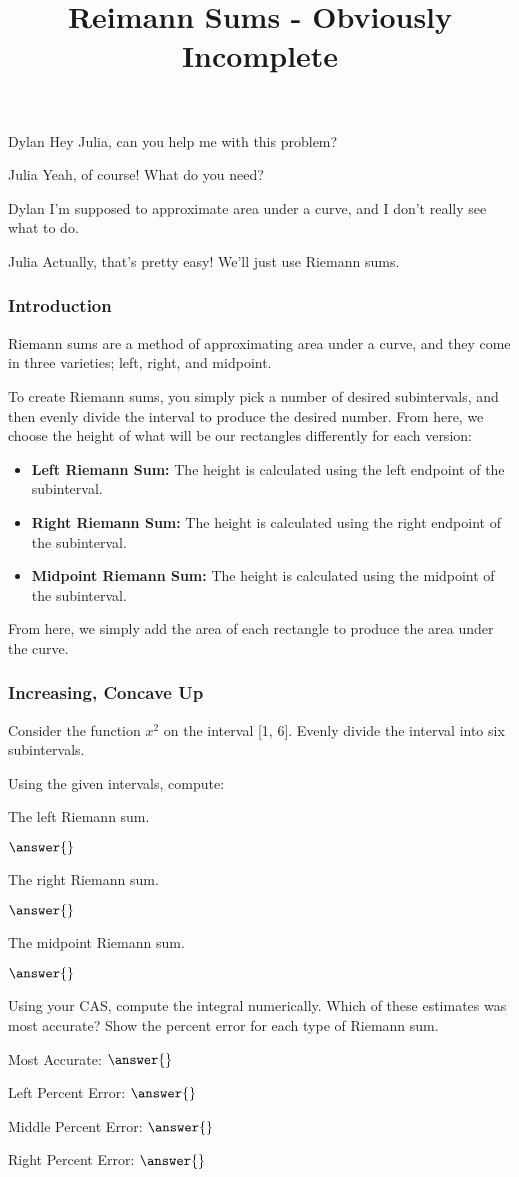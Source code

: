 \documentclass{ximera}
\title{Reimann Sums - Obviously Incomplete}
\begin{document}
\maketitle
\begin{dialogue}
\item[Dylan] Hey Julia, can you help me with this problem?
\item[Julia] Yeah, of course! What do you need?
\item[Dylan] I'm supposed to approximate area under a curve, and I don't really see what to do.
\item[Julia] Actually, that's pretty easy! We'll just use Riemann sums.
\end{dialogue}

\subsubsection{Introduction}
Riemann sums are a method of approximating area under a curve, and they come in three varieties; left, right, and midpoint.

To create Riemann sums, you simply pick a number of desired subintervals, and then evenly divide the interval to produce the desired number. From here, we choose the height of what will be our rectangles differently for each version:
\begin{itemize}
\item{\textbf{Left Riemann Sum:} The height is calculated using the left endpoint of the subinterval.}
\item{\textbf{Right Riemann Sum:} The height is calculated using the right endpoint of the subinterval.}
\item{\textbf{Midpoint Riemann Sum:} The height is calculated using the midpoint of the subinterval.}
\end{itemize}

From here, we simply add the area of each rectangle to produce the area under the curve.

\subsubsection{Increasing, Concave Up}
Consider the function $x^2$ on the interval [1, 6]. Evenly divide the interval into six subintervals.
\begin{question}
Using the given intervals, compute:

The left Riemann sum.

$\answer{}$

The right Riemann sum.

$\answer{}$

The midpoint Riemann sum.

$\answer{}$

Using your CAS, compute the integral numerically. Which of these estimates was most accurate? Show the percent error for each type of Riemann sum.

Most Accurate: $\answer{}$

Left Percent Error: $\answer{}$

Middle Percent Error: $\answer{}$

Right Percent Error: $\answer{}$
\end{question}
\end{document}
